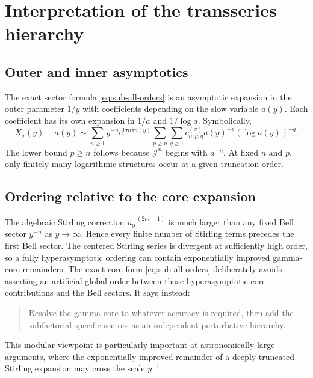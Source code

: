 \documentclass[11pt,a4paper]{article}
\numberwithin{equation}{section}
\theoremstyle{definition}
\theoremstyle{remark}
\newcommand{\e}{\mathrm e}
\newcommand{\ii}{\mathrm i}
\newcommand{\Tail}{\mathcal J}
\begin{document}
\section{Interpretation of the transseries hierarchy}
\label{sec:hierarchy}

\subsection{Outer and inner asymptotics}

The exact sector formula \eqref{eq:sub-all-orders} is an asymptotic expansion
in the outer parameter $1/y$ with coefficients depending on the slow
variable $a(y)$.  Each coefficient has its own expansion in $1/a$ and
$1/\log a$.  Symbolically,
\begin{equation}\label{eq:two-level-symbol}
 X_\sigma(y)-a(y)
 \sim\sum_{n\ge1}y^{-n}\e^{\ii\sigma n\pi a(y)}
 \sum_{p\ge n}\sum_{q\ge1}c_{n,p,q}^{(\sigma)}
 a(y)^{-p}(\log a(y))^{-q}.
\end{equation}
The lower bound $p\ge n$ follows because $\Tail^n$ begins with $a^{-n}$.
At fixed $n$ and $p$, only finitely many logarithmic structures occur at a
given truncation order.

\subsection{Ordering relative to the core expansion}

The algebraic Stirling correction $u_0^{-(2m-1)}$ is much larger than any
fixed Bell sector $y^{-n}$ as $y\to\infty$.  Hence every finite number of
Stirling terms precedes the first Bell sector.  The centered Stirling series
is divergent at sufficiently high order, so a fully hyperasymptotic ordering
can contain exponentially improved gamma-core remainders.  The exact-core
form \eqref{eq:sub-all-orders} deliberately avoids asserting an artificial
global order between those hyperasymptotic core contributions and the Bell
sectors.  It says instead:

\begin{quote}
Resolve the gamma core to whatever accuracy is required, then add the
subfactorial-specific sectors as an independent perturbative hierarchy.
\end{quote}

This modular viewpoint is particularly important at astronomically large
arguments, where the exponentially improved remainder of a deeply truncated
Stirling expansion may cross the scale $y^{-1}$.
\end{document}
